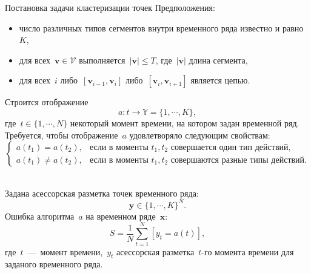 \documentclass[9pt,pdf,hyperref={unicode}]{beamer}
\begin{document}
\begin{frame}[shrink=5]{Постановка задачи кластеризации точек}
\justifying
Предположения:
\begin{itemize}
	\item число различных типов сегментов внутри временного ряда известно и равно~$K$,
	\item для всех~$\textbf{v} \in \mathcal{V}$ выполняется~$\left|\textbf{v}\right| \leq T$, где~$\left|\textbf{v}\right|$ длина сегмента,
	\item для всех~$i$ либо~$[\textbf{v}_{i-1},\textbf{v}_{i}]$ либо~$[\textbf{v}_{i},\textbf{v}_{i+1}]$  является цепью.
\end{itemize}

Строится отображение
$$
a : t \to \mathbb{Y} = \{1,\cdots, K\}, 
$$
где~$t \in \{1,\cdots, N\}$ некоторый момент времени, на котором задан временной ряд.
Требуется, чтобы отображение~$a$ удовлетворяло следующим свойствам:
$$
\begin{cases}
    a\left(t_1\right) = a\left(t_2\right), &  \text{если в моменты } t_1, t_2 \text{ совершается один тип действий},\\
    a\left(t_1\right) \not= a\left(t_2\right), &  \text{если в моменты } t_1, t_2 \text{ совершаются разные типы действий}.
\end{cases}
$$

~\\
Задана асессорская разметка точек временного ряда:
$$
\textbf{y} \in \{1,\cdots,K\}^{N}.
$$
Ошибка алгоритма~$a$ на временном ряде~$\textbf{x}$:
$$
S = \frac{1}{N}\sum_{t=1}^{N}[y_t = a\left(t\right)],
$$
где~$t$~---~момент времени,~$y_t$ асессорская разметка~$t$-го момента времени для заданого временного ряда.

\end{frame}
\end{document}
